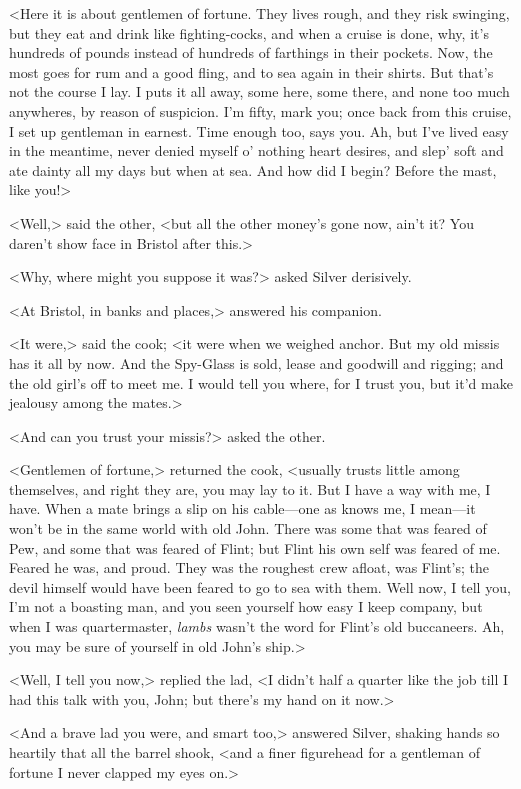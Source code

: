 <Here it is about gentlemen of fortune. They lives rough, and they risk swinging, but they eat and drink like fighting-cocks, and when a cruise is done, why, it's hundreds of pounds instead of hundreds of farthings in their pockets. Now, the most goes for rum and a good fling, and to sea again in their shirts. But that's not the course I lay. I puts it all away, some here, some there, and none too much anywheres, by reason of suspicion. I'm fifty, mark you; once back from this cruise, I set up gentleman in earnest. Time enough too, says you. Ah, but I've lived easy in the meantime, never denied myself o' nothing heart desires, and slep' soft and ate dainty all my days but when at sea. And how did I begin? Before the mast, like you!>

<Well,> said the other, <but all the other money's gone now, ain't it? You daren't show face in Bristol after this.>

<Why, where might you suppose it was?> asked Silver derisively.

<At Bristol, in banks and places,> answered his companion.

<It were,> said the cook; <it were when we weighed anchor. But my old missis has it all by now. And the Spy-Glass is sold, lease and goodwill and rigging; and the old girl's off to meet me. I would tell you where, for I trust you, but it'd make jealousy among the mates.>

<And can you trust your missis?> asked the other.

<Gentlemen of fortune,> returned the cook, <usually trusts little among themselves, and right they are, you may lay to it. But I have a way with me, I have. When a mate brings a slip on his cable—one as knows me, I mean—it won't be in the same world with old John. There was some that was feared of Pew, and some that was feared of Flint; but Flint his own self was feared of me. Feared he was, and proud. They was the roughest crew afloat, was Flint's; the devil himself would have been feared to go to sea with them. Well now, I tell you, I'm not a boasting man, and you seen yourself how easy I keep company, but when I was quartermaster, \textit{lambs} wasn't the word for Flint's old buccaneers. Ah, you may be sure of yourself in old John's ship.>

<Well, I tell you now,> replied the lad, <I didn't half a quarter like the job till I had this talk with you, John; but there's my hand on it now.>

<And a brave lad you were, and smart too,> answered Silver, shaking hands so heartily that all the barrel shook, <and a finer figurehead for a gentleman of fortune I never clapped my eyes on.>


